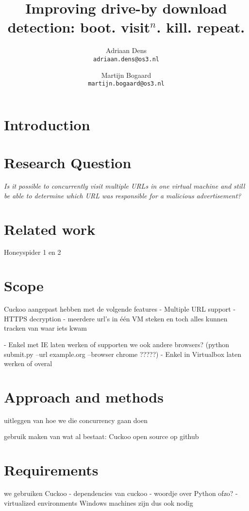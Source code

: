 \documentclass{scrartcl}
\title{Improving drive-by download detection: boot. visit$^n$. kill. repeat.}
\author{
  Adriaan Dens\\
   \texttt{adriaan.dens@os3.nl}
  \and
  Martijn Bogaard\\
   \texttt{martijn.bogaard@os3.nl}
}
\begin{document}
\maketitle
\newpage

\section{Introduction}



\section{Research Question}

\textit{Is it possible to concurrently visit multiple URLs in one virtual machine and still be able to determine which URL was responsible for a malicious advertisement?}
\\
\section{Related work}



Honeyspider 1 en 2

\section{Scope}

	Cuckoo aangepast hebben met de volgende features
		- Multiple URL support
		- HTTPS decryption
		- meerdere url's in één VM steken en toch alles kunnen tracken van waar iets kwam


 - Enkel met IE laten werken of supporten we ook andere browsers?
	(python submit.py --url example.org --browser chrome ?????)
 - Enkel in Virtualbox laten werken of overal


\section{Approach and methods}

uitleggen van hoe we die concurrency gaan doen

gebruik maken van wat al bestaat: Cuckoo
open source op github


\section{Requirements}

we gebruiken Cuckoo
	- dependencies van cuckoo
	- woordje over Python ofzo?
	- virtualized environments
Windows machines zijn dus ook nodig
\end{document}
